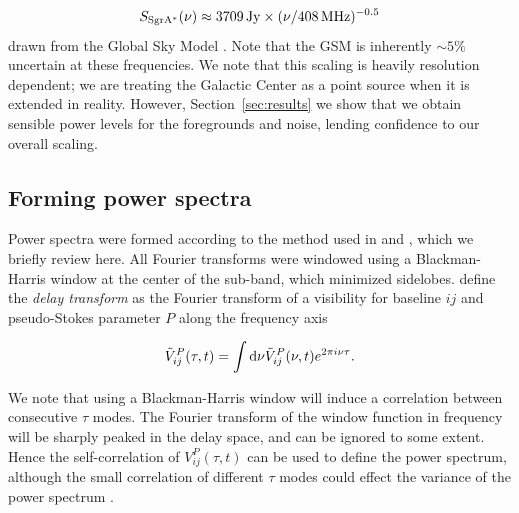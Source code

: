 \documentclass[twocolumn, trackchanges]{aastex61}
\begin{document}
\begin{equation}
S_{\rm Sgr A^*}(\nu) \approx  3709 {\rm\, Jy} \times (\nu/408 {\rm \,MHz})^{-0.5}
\label{eq:freq_scale}
\end{equation}
drawn from the Global Sky Model \citep[GSM;][]{GSM.08,pygsm,GSM.17}. Note that the GSM is inherently $\sim 5\%$ uncertain at these frequencies. We note that this scaling is heavily resolution dependent; we are treating the Galactic Center as a point source when it is extended in reality. However, Section~\ref{sec:results} we show that we obtain sensible power levels for the foregrounds and noise, lending confidence to our overall scaling.

\subsection{Forming power spectra}
\label{subsec:pspec}
Power spectra were formed according to the method used in \cite{Pober13} and \cite{Kohn16}, which we briefly review here. All Fourier transforms were windowed using a Blackman-Harris window at the center of the sub-band, which minimized sidelobes. \cite{Parsons.12a} define the \textit{delay transform} as the Fourier transform of a visibility for baseline $ij$ and pseudo-Stokes parameter $P$ along the frequency axis

\begin{equation}
\tilde{V}_{ij}^{P}(\tau, t) = \int {\rm d}\nu \tilde{V}_{ij}^{P}(\nu, t)e^{2\pi i \nu \tau}.
\end{equation}

We note that using a Blackman-Harris window will induce a correlation between consecutive $\tau$ modes. The Fourier transform of the window function in frequency will be sharply peaked in the delay space, and can be ignored to some extent. Hence the self-correlation of $V_{ij}^{P}(\tau, t)$ can be used to define the power spectrum, although the small correlation of different $\tau$ modes could effect the variance of the power spectrum \citep{Parsons14}.
\end{document}
